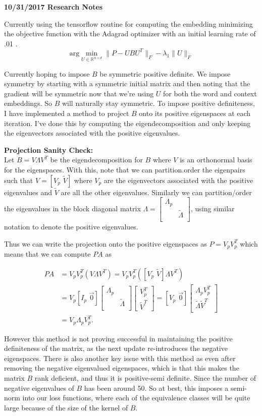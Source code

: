 \documentclass{report}
\newcommand{\argmin}[2]{\text{arg}\min_{#1}#2}
\newcommand{\partitionedV}{[V_p \,\,\tilde{V}]}
\newcommand{\BigLambda}{\begin{bmatrix}
													\Lambda_p & \\
													&\tilde{\Lambda}\\
												\end{bmatrix}}
\newcommand{\vertPartitionedV}{\begin{bmatrix}
																 V_p^T \\
																 \tilde{V}^T
															 \end{bmatrix}}
\begin{document}
	\textbf{10/31/2017 Research Notes}
	
	Currently using the tensorflow routine for computing the embedding minimizing the objective function with the Adagrad optimizer with an initial learning rate of .01 . 
	\[ 
	  \argmin{U \in \mathbb{R}^{n \times d}}{\|P - UBU^T\|_{F} - \lambda_1\|U\|_{F}} 
	\]
	
  Currently hoping to impose $ B $ be symmetric positive definite. We impose symmetry by starting with a symmetric initial matrix and then noting that the gradient will be symmetric now that we're using $ U $ for both the word and context embeddings. So $ B $ will naturally stay symmetric. To impose positive definiteness, I have implemented a method to project $ B $ onto its positive eigenspaces at each iteration. I've done this by computing the eigendecomposition and only keeping the eigenvectors associated with the positive eigenvalues. 
  
  \textbf{Projection Sanity Check:}\\
  Let $ B = V\Lambda V^T $ be the eigendecomposition for $ B $ where $ V $ is an orthonormal basis for the eigenspaces. With this, note that we can partition.order the eigenpairs such that $ V = \partitionedV $ where $ V_p $ are the eigenvectors associated with the positive eigenvalues and $ \tilde{V} $ are all the other eigenvalues. Similarly we can partition/order the eigenvalues in the block diagonal matrix $ \Lambda =  \BigLambda$, using similar notation to denote the positive eigenvalues. 
  
  Thus we can write the projection onto the positive eigenspaces as $ P = V_pV_p^T $ which means that we can compute $ PA $ as 
  
  \begin{align*}
  	PA &= V_pV_p^T(V\Lambda V^T) = V_pV_p^T(\partitionedV\Lambda V^T) \\
  	   &= V_p [I_p \,\,\vec{0}]\BigLambda \vertPartitionedV 
  	    = [V_p \,\, \vec{0}] \begin{bmatrix}
  	                           \Lambda_p V_p^T \\ 
  	                           \tilde{\Lambda} \tilde{V}^T\\ 
 											  	    \end{bmatrix}\\
       &= V_p \Lambda_p V_p^T.
  \end{align*}
	
	However this method is not proving successful in maintaining the positive definiteness of the matrix, as the next update re-introduces the negative eigenspaces. There is also another key issue with this method as even after removing the negative eigenvalued eigenspaces, which is that this makes the matrix $ B $ rank deficient, and thus it is positive-semi definite. Since the number of negative eigenvalues of $ B $ has been around 50. So at best, this imposes a semi-norm into our loss functions, where each of the equivalence classes will be quite large because of the size of the kernel of $ B $.  
	
\end{document}
